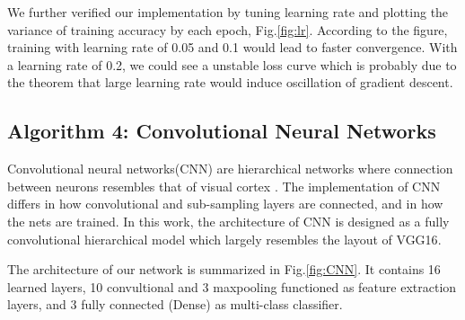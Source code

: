 \documentclass[10pt,conference]{IEEEtran}
\begin{document}
We further verified our implementation by tuning learning rate and plotting the variance of training accuracy by each epoch, Fig.\ref{fig:lr}. According to the figure, training with learning rate of 0.05 and 0.1 would lead to faster convergence. With a learning rate of 0.2, we could see a unstable loss curve which is probably due to the theorem that large learning rate would induce oscillation of gradient descent\cite{jacobs1988increased}. 

\subsection{Algorithm 4: Convolutional Neural Networks}
Convolutional neural networks(CNN) are hierarchical networks where connection between neurons resembles that of visual cortex \cite{matsugu2003subject}. The implementation of CNN differs in how convolutional and sub-sampling layers are connected, and in how the nets are trained. In this work, the architecture of CNN is designed as a fully convolutional hierarchical model which largely resembles the layout of VGG16\cite{simonyan2014very}.

The architecture of our network is summarized in Fig.\ref{fig:CNN}. It contains 16 learned layers, 10 convultional and 3 maxpooling functioned as feature extraction layers, and 3 fully connected (Dense) as multi-class classifier.
\end{document}
